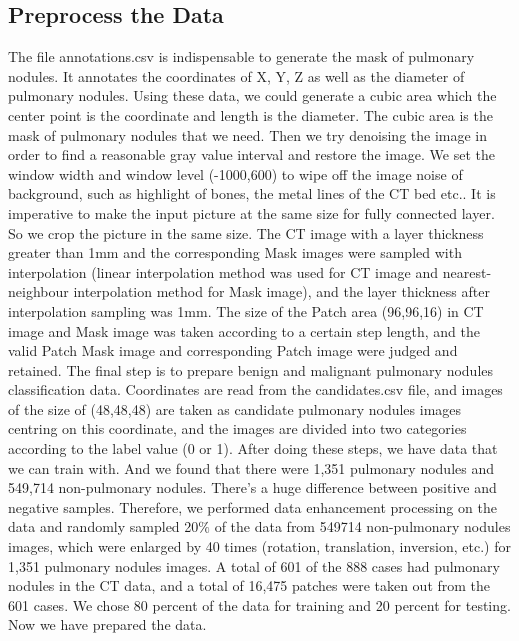 \documentclass[conference]{IEEEtran}
\begin{document}
\subsection{Preprocess the Data}
The file annotations.csv is indispensable to generate the mask of pulmonary nodules. It annotates the coordinates of X, Y, Z as well as the diameter of pulmonary nodules.
Using these data, we could generate a cubic area which the center point is the coordinate and length is the diameter. The cubic area is the mask of pulmonary nodules that we need.
Then we try denoising the image in order to find a reasonable gray value interval and restore the image. We set the window width and window level (-1000,600) to
wipe off the image noise of background, such as highlight of bones, the metal lines of the CT bed etc..
It is imperative to make the input picture at the same size for fully connected layer.
So we crop the picture in the same size. The CT image with a layer thickness greater than 1mm and the corresponding Mask images were sampled with interpolation (linear interpolation method was used for CT image and nearest-neighbour
interpolation method for Mask image), and the layer thickness after interpolation sampling was 1mm. The size of the Patch area (96,96,16) in CT image and Mask image was taken according to a certain step length, and the valid Patch Mask
image and corresponding Patch image were judged and retained. The final step is to prepare benign and malignant pulmonary nodules classification data. Coordinates are read from the candidates.csv file, and images of the size of (48,48,48)
are taken as candidate pulmonary nodules images centring on this coordinate, and the images are divided into two categories according to the label value (0 or 1). After doing these steps, we have data that we can train with. And we found that
there were 1,351 pulmonary nodules and 549,714 non-pulmonary nodules. There’s a huge difference between positive and negative samples. Therefore, we performed data enhancement processing on the data and randomly sampled 20$\%$ of the data from 549714 non-pulmonary
nodules images, which were enlarged by 40 times (rotation, translation, inversion, etc.) for 1,351 pulmonary nodules images. A total of 601 of the 888 cases had pulmonary nodules in the CT data, and a total of 16,475 patches were taken out from the 601 cases.
We chose 80 percent of the data for training and 20 percent for testing. Now we have prepared the data.
\end{document}
